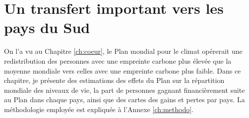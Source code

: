 \documentclass[a5paper,french]{memoir}
\begin{document}







\chapter{Un transfert important vers les pays du Sud\label{ch:effets_distributifs}}

On l'a vu au Chapitre \ref{ch:coeur}, le Plan mondial pour le climat opérerait une redistribution des personnes avec une empreinte carbone plus élevée que la moyenne mondiale vers celles avec une empreinte carbone plus faible. Dans ce chapitre, je présente des estimations des effets du Plan sur la répartition mondiale des niveaux de vie, la part de personnes gagnant financièrement suite au Plan dans chaque pays, ainsi que des cartes des gains et pertes par pays. La méthodologie employée est expliquée à l'Annexe \ref{ch:methodo}.
\end{document}
